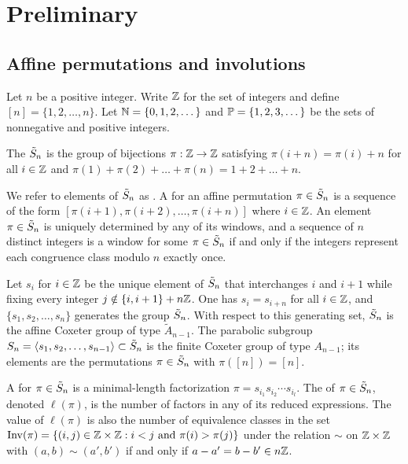 \documentclass[11pt]{article}
\begin{document}
\section{Preliminary}\label{prelim-sect}

\subsection{Affine permutations and involutions}
Let $n$ be a positive integer. Write $\mathbb{Z}$ for the set of integers and define $[n] = \{1,2,\dots,n\}$.
Let $\mathbb{N} = \{0,1,2,\dots\}$ and $\mathbb{P}=\{1,2,3,\dots\}$ be the sets of nonnegative and positive integers.

\begin{definition}
The  $\tilde S_n$ is the group of bijections $\pi:\mathbb{Z} \to \mathbb{Z}$
satisfying $\pi(i+n) = \pi(i)+n$ for all $i \in \mathbb{Z}$ and $\pi(1) + \pi(2) + \dots +\pi(n) = 1 + 2 + \dots +n$.
\end{definition}

We refer to elements of $\tilde S_n$ as .
A  for an affine permutation $\pi \in \tilde S_n$ is a sequence of the form $[\pi(i+1), \pi(i+2),\dots,\pi(i+n)]$ where $i \in \mathbb{Z}$.
An element $\pi \in \tilde S_n$ is uniquely determined by any of its windows,
and a sequence of $n$ distinct integers is a window for some $\pi \in\tilde S_n$ if and only if the integers represent
each congruence class modulo $n$ exactly once.

Let $s_i $ for $i \in \mathbb{Z}$  be the unique element of $\tilde S_n$ that interchanges $i$ and $i+1$ while fixing every integer $j \notin \{i,i+1\} + n\mathbb{Z}$.
One has $s_i = s_{i+n}$ for all $i \in \mathbb{Z}$, and 
 $\{s_1,s_2,\dots,s_n\}$ generates the group $\tilde S_n$.
With respect to this generating set, $\tilde S_n$ is the affine Coxeter group of type $\tilde A_{n-1}$.
The parabolic subgroup $S_n = \langle s_1,s_2,\dots,s_{n-1}\rangle \subset \tilde S_n$
is the finite Coxeter group of type $A_{n-1}$; its elements
are
the permutations $\pi \in \tilde S_n$ with $\pi([n]) = [n]$.

A  for $\pi \in \tilde S_n$ is a minimal-length factorization $\pi = s_{i_1}s_{i_2}\cdots s_{i_l}$.
The  of $\pi \in \tilde S_n$, denoted $\ell(\pi)$, is the number of factors  in any of its reduced expressions.
The value of $\ell(\pi)$ is also the number of equivalence classes in the set
$
\operatorname{Inv}(\pi) = \{ (i,j) \in \mathbb{Z} \times \mathbb{Z} : i< j\text{ and }\pi(i)> \pi(j)\}
$
under the relation $\sim$
on $\mathbb{Z}\times \mathbb{Z}$ with $(a,b) \sim (a',b')$ if and only if $a-a' = b-b' \in n \mathbb{Z}$.
\end{document}

